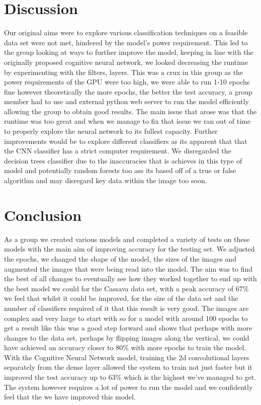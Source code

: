 \section{Discussion}
\label{Disscussion}

Our original aims were to explore various classification techniques on a feasible data set were not met, hindered by the model's power requirement. This led to the group looking at ways to further improve the model, keeping in line with the originally proposed cognitive neural network, we looked decreasing the runtime by experimenting with the filters, layers. This was a crux in this group as the power requirements of the GPU were too high, we were able to run 1-10 epochs fine however theoretically the more epochs, the better the test accuracy, a group member had to use and external python web server to run the model efficiently allowing the group to obtain good results. The main issue that arose was that the runtime was too great and when we manage to fix that issue we ran out of time to properly explore the neural network to its fullest capacity. Further improvements would be to explore different classifiers as its apparent that that the CNN classifier has a strict computer requirement. We disregarded the decision trees classifier due to the inaccuracies that is achieves in this type of model and potentially random forests too ass its based off of a true or false algorithm and may disregard key data within the image too soon. 

\section{Conclusion}
\label{Conclusion}

As a group we created various models and completed a variety of tests on these models with the main aim of improving accuracy for the testing set. We adjusted the epochs, we changed the shape of the model, the sizes of the images and augmented the images that were being read into the model. The aim was to find the best of all changes to eventually see how they worked together to end up with the best model we could for the Cassava data set, with a peak accuracy of 67\% we feel that whilst it could be improved, for the size of the data set and the number of classifiers required of it that this result is very good. The images are complex and very large to start with so for a model with around 100 epochs to get a result like this was a good step forward and shows that perhaps with more changes to the data set, perhaps by flipping images along the vertical, we could have achieved an accuracy closer to 80\% with more epochs to train the model. With the Cognitive Neural Network model, training the 2d convolutional layers separately from the dense layer allowed the system to train not just faster but it improved the test accuracy up to 63\% which is the highest we've managed to get. The system however requires a lot of power to run the model and we confidently feel that the we have improved this model.
